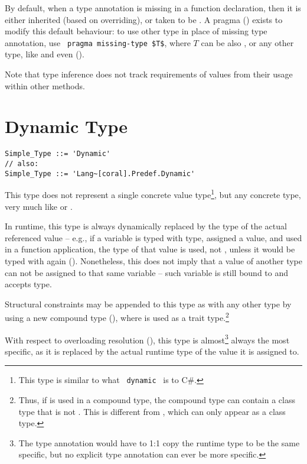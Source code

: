 By default, when a type annotation is missing in a function declaration, then it is either inherited (based on overriding), or taken to be . A pragma () exists to modify this default behaviour: to use other type in place of missing type annotation, use ~\lstinline!pragma missing-type $T$!, where $T$ can be also , or any other type, like  and even  (). 

Note that  type inference does not track requirements of values from their usage within other methods.






\section{Dynamic Type}
\label{sec:dynamic-type}

\syntax\begin{lstlisting}[morekeywords={Dynamic}]
Simple_Type ::= 'Dynamic'
// also:
Simple_Type ::= 'Lang~[coral].Predef.Dynamic'
\end{lstlisting}

This type does not represent a single concrete value type\footnote{This type is similar to what ~\lstinline[language={[Sharp]C}]!dynamic!~ is to C\#.}, but any concrete type, very much like  or . 

In runtime, this type is always dynamically replaced by the type of the actual referenced value -- e.g., if a variable is typed with  type, assigned a value, and used in a function application, the type of that value is used, not , unless it would be typed with  again (). Nonetheless, this does not imply that a value of another type can not be assigned to that same variable -- such variable is still bound to  and accepts  type. 

Structural constraints may be appended to this type as with any other type by using a new compound type (), where  is used as a trait type.\footnote{Thus, if  is used in a compound type, the compound type can contain a class type that is not . This is different from , which can only appear as a class type.}

With respect to overloading resolution (), this type is almost\footnote{The type annotation would have to 1:1 copy the runtime type to be the same specific, but no explicit type annotation can ever be more specific.} always the most specific, as it is replaced by the actual runtime type of the value it is assigned to. 

